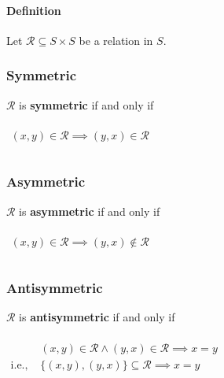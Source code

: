 \paragraph{Definition}

Let $\mathcal{R} \subseteq S \times S$ be a relation in $S$.

\subsubsection{Symmetric}

$\mathcal{R}$ is \textbf{symmetric} if and only if

\begin{math}
  \begin{array}{c}
    \\
    (x, y) \in \mathcal{R} \implies (y, x) \in \mathcal{R}\\
    \\
  \end{array}
\end{math}


\subsubsection{Asymmetric}

$\mathcal{R}$ is \textbf{asymmetric} if and only if

\begin{math}
  \begin{array}{c}
    \\
    (x, y) \in \mathcal{R} \implies (y, x) \notin \mathcal{R}\\
    \\
  \end{array}
\end{math}


\subsubsection{Antisymmetric}

$\mathcal{R}$ is \textbf{antisymmetric} if and only if

\begin{math}
  \begin{array}{ll}
    \\
    &(x,y) \in \mathcal{R} \land (y, x) \in \mathcal{R} \implies x = y\\
    \text{i.e., } & \{(x, y), (y, x) \} \subseteq \mathcal{R} \implies x = y \\
    \\
  \end{array}
\end{math}


